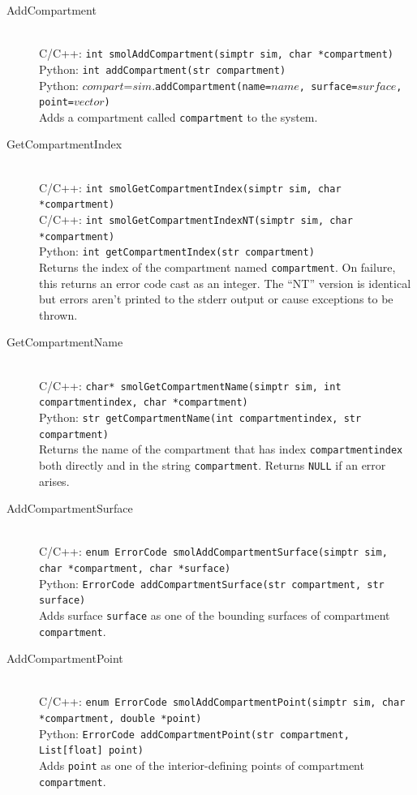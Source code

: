 \documentclass {scrbook}
\newcommand {\ttt} {\texttt}
\begin{document}
\begin{description}

\item[AddCompartment]
\hfill \\
C/C++: \ttt{int smolAddCompartment(simptr sim, char *compartment)}\\
Python: \ttt{int addCompartment(str compartment)}\\
Python: $compart$=$sim$.\ttt{addCompartment(name=$name$, surface=$surface$, point=$vector$)}\\
Adds a compartment called \ttt{compartment} to the system.

\item[GetCompartmentIndex]
\hfill \\
C/C++: \ttt{int smolGetCompartmentIndex(simptr sim, char *compartment)}\\
C/C++: \ttt{int smolGetCompartmentIndexNT(simptr sim, char *compartment)}\\
Python: \ttt{int getCompartmentIndex(str compartment)}\\
Returns the index of the compartment named \ttt{compartment}. On failure, this returns an error code cast as an integer. The ``NT'' version is identical but errors aren't printed to the stderr output or cause exceptions to be thrown.

\item[GetCompartmentName]
\hfill \\
C/C++: \ttt{char* smolGetCompartmentName(simptr sim, int compartmentindex, char *compartment)}\\
Python: \ttt{str getCompartmentName(int compartmentindex, str compartment)}\\
Returns the name of the compartment that has index \ttt{compartmentindex} both directly and in the string \ttt{compartment}. Returns \ttt{NULL} if an error arises.

\item[AddCompartmentSurface]
\hfill \\
C/C++: \ttt{enum ErrorCode smolAddCompartmentSurface(simptr sim, char *compartment, char *surface)}\\
Python: \ttt{ErrorCode addCompartmentSurface(str compartment, str surface)}\\
Adds surface \ttt{surface} as one of the bounding surfaces of compartment \ttt{compartment}.

\item[AddCompartmentPoint]
\hfill \\
C/C++: \ttt{enum ErrorCode smolAddCompartmentPoint(simptr sim, char *compartment, double *point)}\\
Python: \ttt{ErrorCode addCompartmentPoint(str compartment, List[float] point)}\\
Adds \ttt{point} as one of the interior-defining points of compartment \ttt{compartment}.


\end{description}
\end{document}
